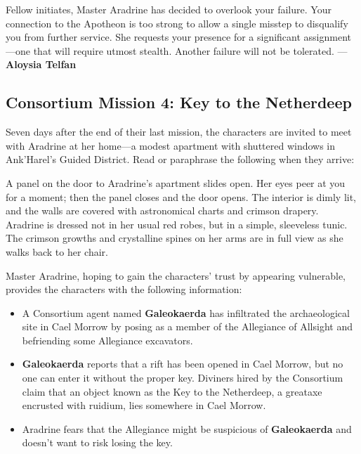 \documentclass[a4paper, 11pt, bg=full, twocolumn, nooutline]{dndbook}
\begin{document}
\begin{DndReadAloud}
Fellow initiates,
Master Aradrine has decided to overlook your failure. Your connection to the Apotheon is too strong to allow a single misstep to disqualify you from further service. She requests your presence for a significant assignment---one that will require utmost stealth. Another failure will not be tolerated.
---\textbf{Aloysia Telfan}
\end{DndReadAloud}

\subsection{Consortium Mission 4: Key to the Netherdeep}

Seven days after the end of their last mission, the characters are invited to meet with Aradrine at her home---a modest apartment with shuttered windows in Ank'Harel's Guided District. Read or paraphrase the following when they arrive:

\begin{DndReadAloud}
A panel on the door to Aradrine's apartment slides open. Her eyes peer at you for a moment; then the panel closes and the door opens. The interior is dimly lit, and the walls are covered with astronomical charts and crimson drapery.
Aradrine is dressed not in her usual red robes, but in a simple, sleeveless tunic. The crimson growths and crystalline spines on her arms are in full view as she walks back to her chair.
\end{DndReadAloud}

Master Aradrine, hoping to gain the characters' trust by appearing vulnerable, provides the characters with the following information:

\begin{itemize}
\item A Consortium agent named \textbf{Galeokaerda} has infiltrated the archaeological site in Cael Morrow by posing as a member of the Allegiance of Allsight and befriending some Allegiance excavators.
\item \textbf{Galeokaerda} reports that a rift has been opened in Cael Morrow, but no one can enter it without the proper key. Diviners hired by the Consortium claim that an object known as the Key to the Netherdeep, a greataxe encrusted with ruidium, lies somewhere in Cael Morrow.
\item Aradrine fears that the Allegiance might be suspicious of \textbf{Galeokaerda} and doesn't want to risk losing the key.
\end{itemize}
\end{document}
